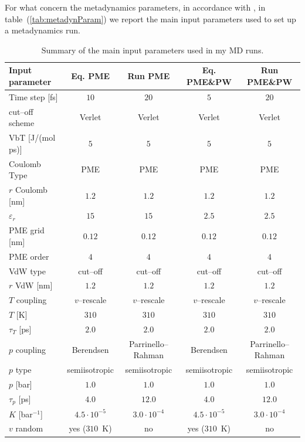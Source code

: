 For what concern the metadynamics parameters, in accordance with \cite{ourPaper}, in table~(\ref{tab:metadynParam}) we report the main input parameters used to set up a metadynamics run.

\begin{table}[h!t]
	\centering\footnotesize
	\begin{tabular}{lcccc}
		\toprule
		Input parameter & Eq. \acs{PME} & Run \acs{PME} & Eq. \acs{PME}\&\acs{PW} & Run \acs{PME}\&\acs{PW} \\ \toprule
		Time step [fs]		& $10$ & $20$ & $5$ & $20$ \\ \midrule
		cut--off scheme		& Verlet & Verlet & Verlet & Verlet \\ \midrule
		VbT [J/(mol ps)]	& $5$ & $5$ & $5$ & $5$ \\ \midrule
		Coulomb Type		& \acs{PME}	& \acs{PME}	& \acs{PME} & \acs{PME} \\ \midrule
		$r$ Coulomb	[nm]	& $1.2$ & $1.2$ & $1.2$ & $1.2$ \\ \midrule
		$\varepsilon_r$		& $15$ & $15$ & $2.5$ & $2.5$ \\ \midrule
		\acs{PME} grid [nm]	& $0.12$ & $0.12$ & $0.12$ & $0.12$ \\ \midrule
	    \acs{PME} order		& $4$ & $4$ & $4$ & $4$ \\ \midrule
		VdW type			& cut--off & cut--off & cut--off & cut--off \\ \midrule
		$r$ VdW [nm]		& $1.2$ & $1.2$ & $1.2$ & $1.2$ \\ \midrule
		$T$ coupling		& $v$--rescale & $v$--rescale & $v$--rescale & $v$--rescale \\ \midrule
		$T$ [K]				& $310$ & $310$ & $310$ & $310$  \\ \midrule
		$\tau_T$ [ps]		& $2.0$ & $2.0$ & $2.0$ & $2.0$ \\ \midrule
		$p$ coupling		& Berendsen & Parrinello--Rahman & Berendsen & Parrinello--Rahman \\ \midrule
		$p$ type			& semiisotropic & semiisotropic & semiisotropic & semiisotropic \\ \midrule
		$p$ [bar]			& $1.0$ & $1.0$ & $1.0$ & $1.0$ \\ \midrule
		$\tau_p$ [ps]		& $4.0$ & $12.0$ & $4.0$ & $12.0$ \\ \midrule
		$K$ [bar$^{-1}$]	& $4.5\cdot 10^{-5}$ & $3.0\cdot 10^{-4}$ & $4.5\cdot 10^{-5}$ & $3.0\cdot 10^{-4}$ \\ \midrule
		$v$ random			& yes ($310$~K) & no & yes ($310$~K) & no \\ \bottomrule 
	\end{tabular}
	\caption{Summary of the main input parameters used in my \acs{MD} runs.}
	\label{tab:inputParam}
\end{table}

